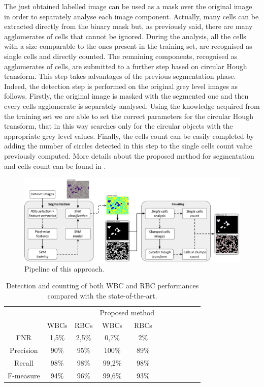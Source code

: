 \documentclass[final,a4paper,12pt,english]{UnicaPhdThesis3}
\begin{document}
The just obtained labelled image can be used as a mask over the original image in order to separately analyse each image component. Actually, many cells can be extracted directly from the binary mask but, as previously said, there are many agglomerates of cells that cannot be ignored. During the analysis, all the cells with a size comparable to the ones present in the training set, are recognised as single cells and directly counted. The remaining components, recognised as agglomerates of cells, are submitted to a further step based on circular Hough transform. This step takes advantages of the previous segmentation phase. Indeed, the detection step is performed on the original grey level images as follows. Firstly, the original image is masked with the segmented one and then every cells agglomerate is separately analysed. Using the knowledge acquired from the training set we are able to set the correct parameters for the circular Hough transform, that in this way searches only for the circular objects with the appropriate grey level values. Finally, the cells count can be easily completed by adding the number of circles detected in this step to the single cells count value previously computed. More details about the proposed method for segmentation and cells count can be found in \cite{DiRuberto2016}.

\begin{figure}[!t]
	\centering
	\includegraphics[height=0.39\textwidth]{images/2016_2_sitis/Schema}
	\caption{\label{fig:Schema}Pipeline of this approach.}
\end{figure}

\begin{table}[!t]
	\centering\tabcolsep=1mm
	\begin{tabular}{ccccccccccc}
		\hline
		&\multicolumn{2}{c}{\cite{Alomari}} 	&\multicolumn{2}{c}{Proposed method}\\
		& 	WBCs 		& RBCs 						&	WBCs 		& 	RBCs \\
		\hline
		FNR			&	1,5\% 		&  2,5\%					&	0,7\% 		&  2\%\\
		Precision &	90\% 		&  95\% 					&	100\% 		&  89\%\\
		Recall		& 	98\% 		&  98\% 					&	 99,2\% 	&  98\%\\
		F-measure 	& 	94\% 		&  96\%						&	 99,6\% 	&  93\%\\
		\hline
	\end{tabular} 
	\label{tab:table2}
	\caption{Detection and counting of both WBC and RBC performances compared with the state-of-the-art.}
\end{table}
\end{document}
